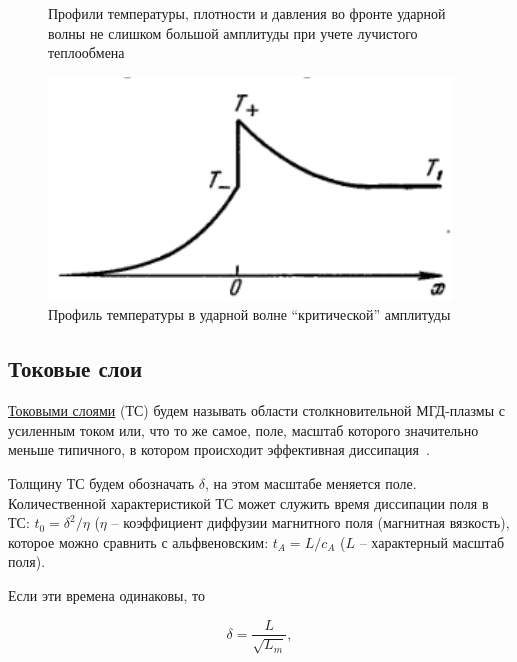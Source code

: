 \documentclass[10pt, a4paper]{article}
\begin{document}
\begin{figure}[ht]
\begin{center}
\begin{minipage}[ht]{0.32\linewidth}
\begin{center}
			\end{center}
			\caption{Профили температуры, плотности и давления
во фронте ударной волны не
слишком большой амплитуды
при учете лучистого теплообмена~\cite{zeldovich}}
			\label{fig:shock_wave_radiation_profiles} 
		\end{minipage}
		\hfill
		\begin{minipage}[ht]{0.32\linewidth}
			\includegraphics[width=1\linewidth]{shock_wave_critical_profiles}
			\caption{Профиль температуры в
ударной волне ``критической'' амплитуды~\cite{zeldovich}}
			\label{fig:shock_wave_critical_profiles} 
		\end{minipage}
	\end{center}
\end{figure}

\subsection{Токовые слои}

\uline{Токовыми слоями} (ТС) будем называть области столкновительной МГД-плазмы с усиленным током или, что то же самое, поле, масштаб которого значительно меньше типичного, в котором происходит эффективная диссипация~\cite{vainshtein}.

Толщину ТС будем обозначать $\delta$, на этом масштабе меняется поле. Количественной характеристикой ТС может служить время диссипации поля в ТС: $t_0 = \delta^2/\eta$ ($\eta$ -- коэффициент диффузии магнитного поля (магнитная
вязкость), которое можно сравнить с альфвеновским: $t_A = L/c_A$ ($L$ -- характерный масштаб поля). 

Если эти времена одинаковы, то

\begin{equation*}
	\delta = \frac{L}{\sqrt{L_m}},
\end{equation*}
\end{document}
